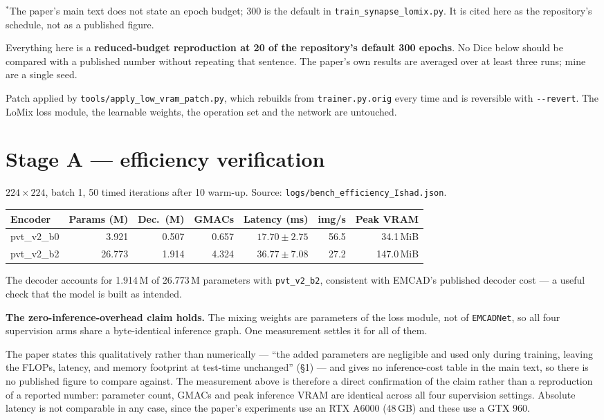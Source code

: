 \documentclass[11pt,a4paper]{article}
\newcommand{\code}[1]{\texttt{\small #1}}
\begin{document}
$^\ast$The paper's main text does not state an epoch budget; 300 is the default
in \code{train\_synapse\_lomix.py}. It is cited here as the repository's
schedule, not as a published figure.

Everything here is a \textbf{reduced-budget reproduction at 20 of the
repository's default 300 epochs}. No Dice below should be compared with a
published number without repeating that sentence. The paper's own results are
averaged over at least three runs; mine are a single seed.

Patch applied by \code{tools/apply\_low\_vram\_patch.py}, which rebuilds from
\code{trainer.py.orig} every time and is reversible with \code{-{}-revert}. The
LoMix loss module, the learnable weights, the operation set and the network are
untouched.

\section{Stage A --- efficiency verification}

$224\times224$, batch 1, 50 timed iterations after 10 warm-up. Source:
\code{logs/bench\_efficiency\_Ishad.json}.

\begin{center}
\begin{tabular}{@{}lrrrrrr@{}}
\toprule
\textbf{Encoder} & \textbf{Params (M)} & \textbf{Dec.\ (M)} & \textbf{GMACs} &
\textbf{Latency (ms)} & \textbf{img/s} & \textbf{Peak VRAM} \\
\midrule
pvt\_v2\_b0 & 3.921 & 0.507 & 0.657 & $17.70 \pm 2.75$ & 56.5 & 34.1\,MiB \\
pvt\_v2\_b2 & 26.773 & 1.914 & 4.324 & $36.77 \pm 7.08$ & 27.2 & 147.0\,MiB \\
\bottomrule
\end{tabular}
\end{center}

The decoder accounts for 1.914\,M of 26.773\,M parameters with
\code{pvt\_v2\_b2}, consistent with EMCAD's published decoder cost --- a useful
check that the model is built as intended.

\textbf{The zero-inference-overhead claim holds.} The mixing weights are
parameters of the loss module, not of \code{EMCADNet}, so all four supervision
arms share a byte-identical inference graph. One measurement settles it for all
of them.

The paper states this qualitatively rather than numerically --- ``the added
parameters are negligible and used only during training, leaving the FLOPs,
latency, and memory footprint at test-time unchanged'' (\S1) --- and gives no
inference-cost table in the main text, so there is no published figure to
compare against. The measurement above is therefore a direct confirmation of the
claim rather than a reproduction of a reported number: parameter count, GMACs
and peak inference VRAM are identical across all four supervision settings.
Absolute latency is not comparable in any case, since the paper's experiments
use an RTX A6000 (48\,GB) and these use a GTX 960.
\end{document}

